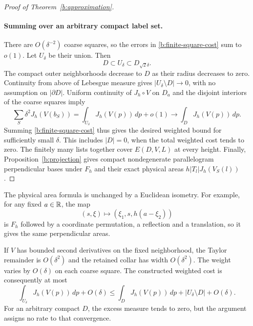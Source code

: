 \begin{proof}[Proof of Theorem~\ref{b:approximation}]
\paragraph{Summing over an arbitrary compact label set.}
There are $O(\delta^{-2})$ coarse squares, so the errors in
\eqref{b:finite-square-cost} sum to $o(1)$. Let $U_\delta$ be
their union. Then
\[
 D\subset U_\delta\subset D_{\sqrt2\delta}.
\]
The compact outer neighborhoods decrease to $D$ as their radius
decreases to zero. Continuity from above of Lebesgue measure gives
$|U_\delta\setminus D|\to0$, with no assumption on
$|\partial D|$. Uniform continuity of $J_h\circ V$ on $D_a$
and the disjoint interiors of the coarse squares imply
\[
 \sum_S\delta^2J_h(V(b_S))
 =\int_{U_\delta}J_h(V(p))\,dp+o(1)
 \longrightarrow\int_DJ_h(V(p))\,dp.
\]
Summing \eqref{b:finite-square-cost} thus gives the desired weighted
bound for sufficiently small $\delta$. This includes $|D|=0$,
when the total weighted cost tends to zero. The finitely many lists
together cover $E(D,V,L)$ at every height. Finally,
Proposition~\ref{b:projection} gives compact nondegenerate
parallelogram perpendicular bases under $F_h$ and their exact
physical areas $h|T_l|J_h(V_S(l))$.
\end{proof}

The physical area formula is unchanged by a Euclidean isometry.
For example, for any fixed $a\in\mathbb R$, the map
\[
 (s,\xi)\longmapsto(\xi_1,s,h(a-\xi_2))
\]
is $F_h$ followed by a coordinate permutation, a reflection and a
translation, so it gives the same perpendicular areas.

\begin{remark}\label{b:smooth-rate}
If $V$ has bounded second derivatives on the fixed neighborhood,
the Taylor remainder is $O(\delta^2)$ and the retained collar has
width $O(\delta^2)$. The weight varies by $O(\delta)$ on each
coarse square. The constructed weighted cost is consequently at most
\[
 \int_{U_\delta}J_h(V(p))\,dp+O(\delta)
 \le\int_DJ_h(V(p))\,dp+|U_\delta\setminus D|+O(\delta).
\]
For an arbitrary compact $D$, the excess measure tends to zero,
but the argument assigns no rate to that convergence.
\end{remark}
